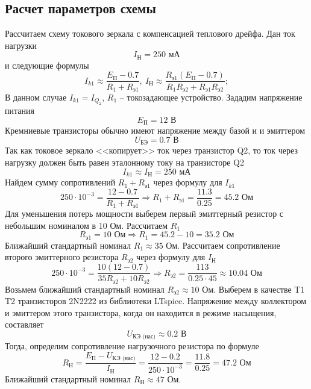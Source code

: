 \documentclass[a4paper, 12pt]{article}
\begin{document}
    \subsection{Расчет параметров схемы}
    Рассчитаем схему токового зеркала с компенсацией теплового дрейфа.
    Дан ток нагрузки $$I_\text{Н}=250\text{ мА}$$
    и следующие формулы
    $$
    I_{k1}\approx\dfrac{E_\text{П}-0.7}{R_1+R_\text{э1}},\ I_\text{Н}\approx\dfrac{R_\text{э1}\left( E_\text{П}-0.7 \right)}{R_1R_\text{э2}+R_\text{э1}R_\text{э2}};
    $$
    В данном случае $I_{k1}=I_{Q_2}$, $R_1$ -- токозадающее устройство. Зададим напряжение питания $$E_\text{П}=12\text{ В}$$
    Кремниевые транзисторы обычно имеют напряжение между базой и и эмиттером
    $$
    U_\text{БЭ}=0.7\text{ В}
    $$
    Так как токовое зеркало <<копирует>> ток через транзистор Q2, то ток через
    нагрузку должен быть равен эталонному току на транзисторе Q2
    $$
    I_{k1}\approx I_\text{Н}=250\text{ мА}
    $$
    Найдем сумму сопротивлений $R_1+R_\text{э1}$ через формулу для $I_{k1}$
    $$
    250\cdot10^{-3}=\dfrac{12-0.7}{R_1+R_\text{э1}}\Rightarrow R_1+R_\text{э1}=\dfrac{11.3}{0.25}=45.2\text{ Ом}
    $$
    Для уменьшения потерь мощности выберем первый эмиттерный резистор с небольшим номиналом в 10 Ом. Рассчитаем $R_1$
    $$
    R_\text{э1}=10\text{ Ом}\Rightarrow R_1=45.2-10=35.2\text{ Ом}
    $$
    Ближайший стандартный номинал $R_1\approx35$ Ом. Рассчитаем сопротивление второго эмиттерного резистора $R_\text{э2}$ через формулу для $I_\text{Н}$
    $$
    250\cdot10^{-3}=\dfrac{10\left( 12-0.7 \right)}{35R_\text{э2}+10R_\text{э2}}\Rightarrow R_\text{э2}=\dfrac{113}{0.25\cdot45}\approx10.04\text{ Ом}
    $$
    Возьмем ближайший стандартный номинал $R_\text{э2}\approx10$ Ом. Выберем в качестве T1 T2 транзисторов 2N2222 из библиотеки LTspice.
    Напряжение между коллектором и эмиттером этого транзистора, когда он находится в режиме насыщения, составляет
    $$
    U_\text{КЭ (нас)}\approx0.2\text{ В}
    $$
    Тогда, определим сопротивление нагрузочного резистора по формуле
    $$
    R_\text{Н}=\dfrac{E_\text{П}-U_\text{КЭ (нас)}}{I_\text{Н}}=\dfrac{12-0.2}{250\cdot10^{-3}}=\dfrac{11.8}{0.25}=47.2\text{ Ом}
    $$
    Ближайший стандартный номинал $R_\text{Н}\approx47$ Ом.
\end{document}
